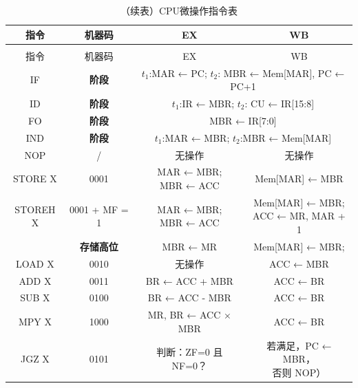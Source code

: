 \documentclass[lang=cn,a4paper,newtx]{elegantpaper}
\begin{document}
\begin{longtable}{cccc}
  \caption{CPU微操作指令表} \label{tab:five_stage_pipeline}\\
  \toprule
  指令 & 机器码  & EX & WB \\
  \midrule
  \endfirsthead

  \toprule
  \caption[]{（续表）CPU微操作指令表} \\
  \toprule
  指令 & 机器码 & EX & WB \\
  \midrule
  \endhead

  \bottomrule
  \endlastfoot
  \rowcolor{red!10}
  IF & \textbf{阶段} & \multicolumn{2}{c}{$t_1$:MAR ← PC; $t_2$: MBR ← Mem[MAR], PC ← PC+1} \\
  \midrule
  \rowcolor{yellow!10}
  ID & \textbf{阶段} & \multicolumn{2}{c}{$t_1$:IR ← MBR; $t_2$: CU ← IR[15:8]}\\
  \midrule
  \rowcolor{blue!10}
  FO & \textbf{阶段} & \multicolumn{2}{c}{MBR ← IR[7:0]} \\
  \midrule
  \rowcolor{green!10}
  
  IND & \textbf{阶段} & \multicolumn{2}{c}{$t_1$:MAR ← MBR;  $t_2$:MBR ← Mem[MAR]}\\
  \midrule
  NOP & / & 无操作 & 无操作 \\
  \midrule
  STORE X & 0001  & \makecell{MAR ← MBR;\\ MBR ← ACC} & Mem[MAR] ← MBR \\
  STOREH X      & 0001 + MF = 1 & \makecell{MAR ← MBR;\\ MBR ← ACC} &  \makecell{Mem[MAR] ← MBR;\\ ACC ← MR, MAR + 1}  \\
                & \textbf{存储高位} & MBR ← MR & Mem[MAR] ← MBR; \\
  \midrule
  LOAD X & 0010 &
  无操作 & 
  ACC ← MBR \\
  \midrule
  ADD X & 0011 &
  
  BR ← ACC + MBR & 
  ACC ← BR \\

  SUB X & 0100 &
  
  BR ← ACC - MBR & 
  ACC ← BR \\
  MPY X & 1000 &
  
  MR, BR ← ACC × MBR &
  ACC ← BR \\
  \midrule
  JGZ X & 0101 &
   
  判断：ZF=0 且 NF=0？ & 
  \makecell{若满足，PC ← MBR，\\否则 NOP）} \\


\end{longtable}
\end{document}

